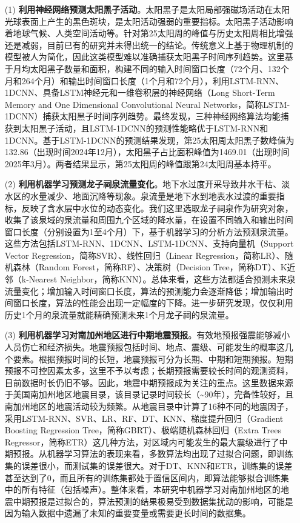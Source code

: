 \begin{enumerate}

  \item[(1)] \textbf{利用神经网络预测太阳黑子活动}。太阳黑子是太阳局部强磁场活动在太阳光球表面上产生的黑色斑块，是太阳活动强弱的重要指标。太阳黑子活动影响着地球气候、人类空间活动等。针对第25太阳周的峰值与历史太阳周相比增强还是减弱，目前已有的研究并未得出统一的结论。传统意义上基于物理机制的模型被人为简化，因此这类模型难以准确捕获太阳黑子时间序列趋势。这里基于月均太阳黑子数量和面积，构建不同的输入时间窗口长度（72个月、132个月和264个月）和输出时间窗口长度（1个月和72个月），利用LSTM-RNN、1DCNN、具备LSTM神经元和一维卷积层的神经网络（Long Short-Term Memory and One Dimensional Convolutional Neural Networks，简称LSTM-1DCNN）捕获太阳黑子时间序列趋势。最终发现，三种神经网络算法均能捕获到太阳黑子活动，且LSTM-1DCNN的预测性能略优于LSTM-RNN和1DCNN。基于LSTM-1DCNN的预测结果发现，第25太阳周太阳黑子数峰值为132.86（出现时间2024年12月），太阳黑子占比面积峰值为1469.01（出现时间2025年3月）。两者结果显示，第25太阳周的峰值跟第24太阳周基本持平。

  \item[{(2)}] \textbf{利用机器学习预测龙子祠泉流量变化}。地下水过度开采导致井水干枯、淡水区的水量减少、地面沉降等现象。泉流量是地下水到地表水过渡的重要指标，反映了含水层中水位的动态变化。我们这里选取龙子祠泉作为研究对象，收集了该泉域的泉流量和周围九个区域的降水量，在设置不同输入和输出时间窗口长度（分别设置为1至4个月）下，基于机器学习的分析方法预测泉流量。这些方法包括LSTM-RNN、1DCNN、LSTM-1DCNN、支持向量机（Support Vector Regression，简称SVR）、线性回归（Linear Regression，简称LR）、随机森林（Random Forest，简称RF）、决策树（Decision Tree，简称DT）、K近邻（k-Nearest Neighbor，简称KNN）。总体来看，这些方法都适合预测未来泉流量变化；增加输入时间窗口长度，算法的预测能力会逐渐降低；增加输出时间窗口长度，算法的性能会出现一定幅度的下降。进一步研究发现，仅仅利用历史1个月的泉流量就能精确预测未来1个月龙子祠的泉流量。
  
  \item[(3)] \textbf{利用机器学习对南加州地区进行中期地震预报}。有效地预报强震能够减小人员伤亡和经济损失。地震预报包括时间、地点、震级、可能发生的概率这几个要素。根据预报时间的长短，地震预报可分为长期、中期和短期预报。短期预报不可控因素太多，这里不予以考虑；长期预报需要较长时间的观测资料，目前数据时长仍旧不够。因此，地震中期预报成为关注的重点。这里数据来源于美国南加州地区地震目录，该目录记录时间较长（\sim 90年），完备性较好，且南加州地区的地震活动较为频繁。从地震目录中计算了16种不同的地震因子，采用LSTM-RNN、SVR、LR、RF、DT、KNN、梯度提升回归（Gradient Boosting Regression Tree，简称GBRT）、极端随机森林回归（Extra Trees Regressor，简称ETR）这几种方法，对区域内可能发生的最大震级进行了中期预报。从机器学习算法的表现来看，多数算法均出现了过拟合问题，即训练集的误差很小，而测试集的误差很大。对于DT、KNN和ETR，训练集的误差甚至达到了0，而且所有的训练集都处于置信区间内，即算法能够拟合训练集中的所有特征（包括噪声）。整体来看，本研究中机器学习对南加州地区的地震中期预报是过拟合的，算法预测的结果极易受到数据集扰动的影响，可能是因为输入数据中遗漏了未知的重要变量或需要更长时间的数据集。


\end{enumerate}
